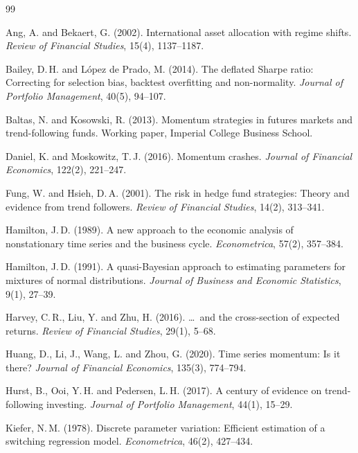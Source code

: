 \documentclass[11pt,a4paper]{article}
\begin{document}
\begin{thebibliography}{99}
\setlength{\itemsep}{2pt}
\small

Ang, A. and Bekaert, G. (2002). International asset allocation with regime shifts. \textit{Review of Financial Studies}, 15(4), 1137--1187.

Bailey, D.\,H. and L\'opez de Prado, M. (2014). The deflated Sharpe ratio: Correcting for selection bias, backtest overfitting and non-normality. \textit{Journal of Portfolio Management}, 40(5), 94--107.

Baltas, N. and Kosowski, R. (2013). Momentum strategies in futures markets and trend-following funds. Working paper, Imperial College Business School.

Daniel, K. and Moskowitz, T.\,J. (2016). Momentum crashes. \textit{Journal of Financial Economics}, 122(2), 221--247.

Fung, W. and Hsieh, D.\,A. (2001). The risk in hedge fund strategies: Theory and evidence from trend followers. \textit{Review of Financial Studies}, 14(2), 313--341.

Hamilton, J.\,D. (1989). A new approach to the economic analysis of nonstationary time series and the business cycle. \textit{Econometrica}, 57(2), 357--384.

Hamilton, J.\,D. (1991). A quasi-Bayesian approach to estimating parameters for mixtures of normal distributions. \textit{Journal of Business and Economic Statistics}, 9(1), 27--39.

Harvey, C.\,R., Liu, Y. and Zhu, H. (2016). \ldots\ and the cross-section of expected returns. \textit{Review of Financial Studies}, 29(1), 5--68.

Huang, D., Li, J., Wang, L. and Zhou, G. (2020). Time series momentum: Is it there? \textit{Journal of Financial Economics}, 135(3), 774--794.

Hurst, B., Ooi, Y.\,H. and Pedersen, L.\,H. (2017). A century of evidence on trend-following investing. \textit{Journal of Portfolio Management}, 44(1), 15--29.

Kiefer, N.\,M. (1978). Discrete parameter variation: Efficient estimation of a switching regression model. \textit{Econometrica}, 46(2), 427--434.


\end{thebibliography}
\end{document}
